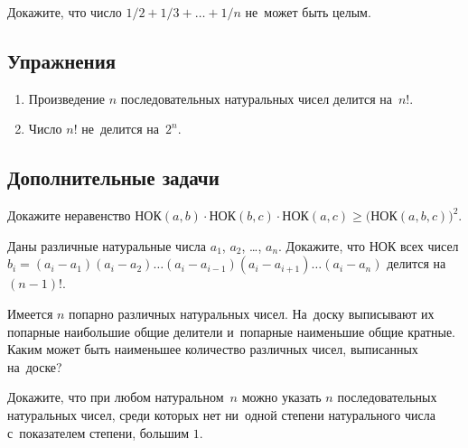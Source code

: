


Докажите, что число $1/2 + 1/3 + \ldots + 1/n$ не~может быть целым.


\subsection*{Упражнения}

\begin{enumerate}

\item
Произведение $n$ последовательных натуральных чисел делится на~$n!$.

\item
Число $n!$ не~делится на~$2^{n}$.

\end{enumerate}


\subsection*{Дополнительные задачи}

\begin{problems}

\item
Докажите неравенство
\(
    \text{НОК}(a, b) \cdot \text{НОК}(b, c) \cdot \text{НОК}(a, c)
\geq
    \bigl( \text{НОК}(a, b, c) \bigr)^2
\).

\item
Даны различные натуральные числа $a_1$, $a_2$, \ldots, $a_n$.
Докажите, что НОК всех чисел
\(
    b_{i}
=
    (a_{i} - a_{1}) (a_{i} - a_{2}) \ldots
    (a_{i} - a_{i-1}) (a_{i} - a_{i+1}) \ldots
    (a_{i} - a_{n})
\)
делится на~$(n-1)!$.

\item
Имеется $n$ попарно различных натуральных чисел.
На~доску выписывают их попарные наибольшие общие делители и~попарные наименьшие
общие кратные.
Каким может быть наименьшее количество различных чисел, выписанных на~доске?

\item
Докажите, что при любом натуральном~$n$ можно указать $n$ последовательных
натуральных чисел, среди которых нет ни~одной степени натурального числа
с~показателем степени, большим $1$.

\end{problems}

